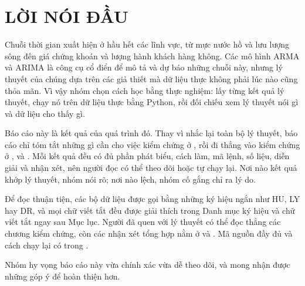 \clearpage
{}
\section*{LỜI NÓI ĐẦU}

Chuỗi thời gian xuất hiện ở hầu hết các lĩnh vực, từ mực nước hồ và lưu lượng sông đến giá chứng khoán và lượng hành khách hàng không. Các mô hình ARMA và ARIMA là công cụ cổ điển để mô tả và dự báo những chuỗi này, nhưng lý thuyết của chúng dựa trên các giả thiết mà dữ liệu thực không phải lúc nào cũng thỏa mãn. Vì vậy nhóm chọn cách học bằng thực nghiệm: lấy từng kết quả lý thuyết, chạy nó trên dữ liệu thực bằng Python, rồi đối chiếu xem lý thuyết nói gì và dữ liệu cho thấy gì.

Báo cáo này là kết quả của quá trình đó. Thay vì nhắc lại toàn bộ lý thuyết, báo cáo chỉ tóm tắt những gì cần cho việc kiểm chứng ở , rồi đi thẳng vào kiểm chứng ở ,  và . Mỗi kết quả đều có đủ phần phát biểu, cách làm, mã lệnh, số liệu, diễn giải và nhận xét, nên người đọc có thể theo dõi hoặc tự chạy lại. Nơi nào kết quả khớp lý thuyết, nhóm nói rõ; nơi nào lệch, nhóm cố gắng chỉ ra lý do.

Để đọc thuận tiện, các bộ dữ liệu được gọi bằng những ký hiệu ngắn như HU, LY hay DR, và mọi chữ viết tắt đều được giải thích trong Danh mục ký hiệu và chữ viết tắt ngay sau Mục lục. Người đã quen với lý thuyết có thể đọc thẳng các chương kiểm chứng, còn các nhận xét tổng hợp nằm ở  và . Mã nguồn đầy đủ và cách chạy lại có trong .

Nhóm hy vọng báo cáo này vừa chính xác vừa dễ theo dõi, và mong nhận được những góp ý để hoàn thiện hơn.
